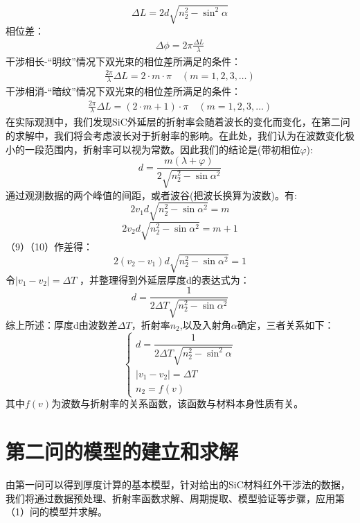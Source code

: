 \documentclass{cumcmthesis}
\begin{document}
\begin{equation}
\Delta L = 2d \sqrt{n_2^2 - \sin^2 \alpha} \tag{5}
\end{equation}
相位差：
\begin{gather}
	\Delta \phi = 2\pi \frac{\Delta L}{\lambda}
\end{gather}
干涉相长-“明纹”情况下双光束的相位差所满足的条件：
\begin{gather}
	\frac{2\pi}{\lambda}\Delta L = 2\cdot m\cdot \pi  \quad (m=1,2,3,\ldots)
\end{gather}
干涉相消-“暗纹”情况下双光束的相位差所满足的条件：
\begin{gather}
	\frac{2\pi}{\lambda}\Delta L = (2\cdot m + 1 )\cdot \pi \quad (m=1,2,3,\ldots)
\end{gather}
在实际观测中，我们发现SiC外延层的折射率会随着波长的变化而变化，在第二问的求解中，我们将会考虑波长对于折射率的影响。在此处，我们认为在波数变化极小的一段范围内，折射率可以视为常数。因此我们的结论是(带初相位$\varphi$):
\begin{equation}
	d = \frac{m (\lambda + \varphi)  }{2\sqrt{n_2^2 - \sin \alpha^2}}
\end{equation}
通过观测数据的两个峰值的间距，或者波谷(把波长换算为波数)。有:
\begin{equation}
2v_1d\sqrt{n_2^2 - \sin \alpha^2} = m
\end{equation}
\begin{equation}
2v_2d\sqrt{n_2^2 - \sin \alpha^2} = m+1
\end{equation}
（9）（10）作差得：
\begin{equation}
2(v_2-v_1)d\sqrt{n_2^2 - \sin \alpha^2} = 1
\end{equation}
令$
|v_1 - v_2| = \Delta T
$
，并整理得到外延层厚度d的表达式为：\begin{equation}
d = \frac{1}{2 \Delta T \sqrt{n_2^2 - \sin \alpha^2}}
\end{equation}
综上所述：厚度d由波数差$\Delta T$，折射率$n_2$,以及入射角$\alpha$确定，三者关系如下：
\begin{equation}
\begin{cases}
d = \dfrac{1}{2 \Delta T \sqrt{n_2^{2}-\sin^{2}\alpha}}\\[4pt]
|v_{1}-v_{2}|=\Delta T\\[4pt]
n_{2}=f(v)
\end{cases}
\label{eq:thickness}
\end{equation}
其中$f(v)$为波数与折射率的关系函数，该函数与材料本身性质有关。
	\section{第二问的模型的建立和求解}
	由第一问可以得到厚度计算的基本模型，针对给出的SiC材料红外干涉法的数据，我们将通过数据预处理、折射率函数求解、周期提取、模型验证等步骤，应用第（1）问的模型并求解。
\end{document}
